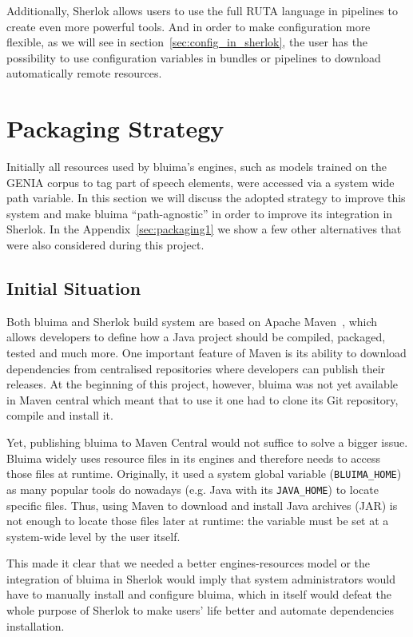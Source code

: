 \documentclass{article}
\newcommand{\VAR}[1]{\mbox{\texttt{#1}}}
\newcommand{\JAR}{JAR\xspace}
\begin{document}
Additionally, Sherlok allows users to use the full RUTA language in pipelines to create even more
powerful tools. And in order to make configuration more flexible, as we will see in
section~\ref{sec:config_in_sherlok}, the user has the possibility to use configuration variables in
bundles or pipelines to download automatically remote resources.

\section{Packaging Strategy}
\label{sec:packaging2}

Initially all resources used by bluima's engines, such as models trained on the GENIA corpus
\cite{genia} to tag part of speech elements, were accessed via a system wide path variable. In this
section we will discuss the adopted strategy to improve this system and make bluima
``path-agnostic'' in order to improve its integration in Sherlok. In the
Appendix~\ref{sec:packaging1} we show a few other alternatives that were also considered during this
project.

\subsection{Initial Situation}

Both bluima and Sherlok build system are based on Apache Maven~\cite{maven}, which allows developers
to define how a Java project should be compiled, packaged, tested and much more. One important
feature of Maven is its ability to download dependencies from centralised repositories where
developers can publish their releases. At the beginning of this project, however, bluima was not yet
available in Maven central which meant that to use it one had to clone its Git repository, compile
and install it.

Yet, publishing bluima to Maven Central would not suffice to solve a bigger issue. Bluima widely
uses resource files in its engines and therefore needs to access those files at runtime. Originally,
it used a system global variable (\VAR{BLUIMA\_HOME}) as many popular tools do nowadays (e.g. Java
with its \VAR{JAVA\_HOME}) to locate specific files. Thus, using Maven to download and install Java
archives (\JAR) is not enough to locate those files later at runtime: the variable must be set at a
system-wide level by the user itself.

This made it clear that we needed a better engines-resources model or the integration of bluima in
Sherlok would imply that system administrators would have to manually install and configure bluima,
which in itself would defeat the whole purpose of Sherlok to make users' life better and automate
dependencies installation.
\end{document}
